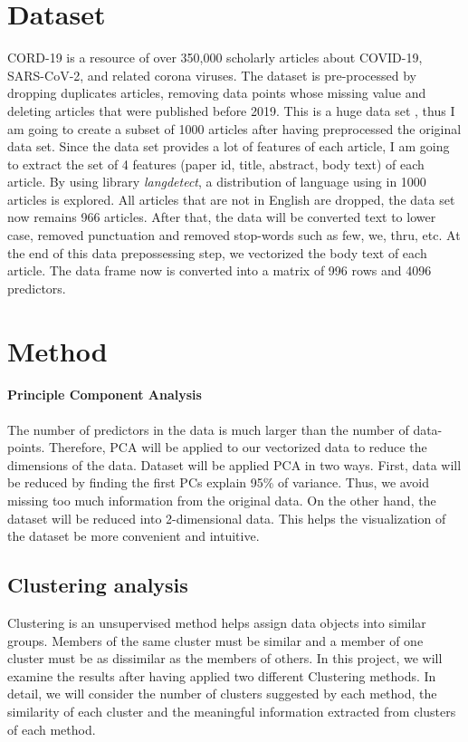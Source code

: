 \documentclass[12pt]{article}
\begin{document}
\section{Dataset}
CORD-19 is a resource of over 350,000 scholarly articles about COVID-19, SARS-CoV-2, and related corona viruses. 
The dataset is pre-processed by dropping duplicates articles, removing data points whose missing value and deleting articles that were published before 2019.  This is a huge data set , thus I am going to create a subset of 1000 articles after having preprocessed the original data set. Since the data set provides a lot of features of each article, I am going to extract the set of 4 features (paper id, title, abstract, body text) of each article. By using library \textit{langdetect}, a distribution of language using in 1000 articles is explored. All articles that are not in English are dropped, the data set now remains 966 articles. After that, the data will be converted text to lower case, removed punctuation and removed stop-words such as few, we, thru, etc. At the end of this data prepossessing step, we vectorized the body text of each article. The data frame now is converted into a matrix of  996 rows and 4096 predictors. 
\section{Method} %
\paragraph{Principle Component Analysis }
The number of predictors in the data is much larger than the number of data-points. Therefore, PCA will be applied to our vectorized data to reduce the dimensions of the data. Dataset will be applied PCA in two ways. First, data will be reduced by finding the first PCs explain 95\% of variance. Thus, we avoid missing too much information from the original data. On the other hand, the dataset will be reduced into 2-dimensional data. This helps the visualization of the dataset be more convenient and intuitive. 
\subsection{Clustering analysis}
Clustering is an unsupervised method helps assign data objects into similar groups. Members of the same cluster must be similar and a member of one cluster must be as dissimilar as the members of others. In this project, we will examine the results after having applied two different Clustering methods. In detail, we will consider the number of clusters suggested by each method, the similarity of each cluster and the meaningful information extracted from clusters of each method.
\end{document}
